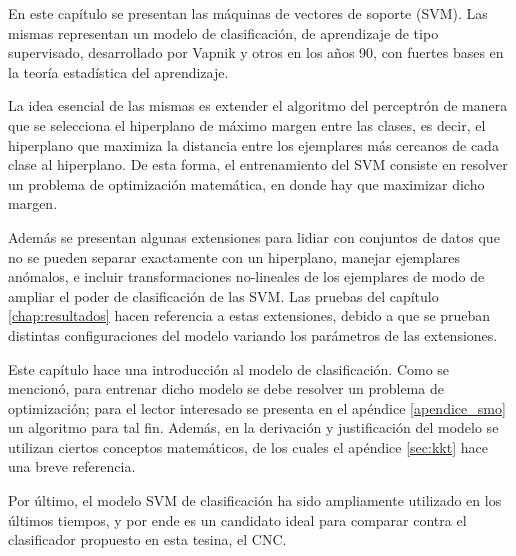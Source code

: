   
En este capítulo se presentan las máquinas de vectores de soporte (SVM). Las mismas representan un modelo de clasificación, de aprendizaje de tipo supervisado, desarrollado por Vapnik y otros en los años 90, con fuertes bases en la teoría estadística del aprendizaje. 

La idea esencial de las mismas es extender el algoritmo del perceptrón de manera que se selecciona el hiperplano de máximo margen entre las clases, es decir, el hiperplano que maximiza la distancia entre los ejemplares más cercanos de cada clase al hiperplano. De esta forma, el entrenamiento del SVM consiste en resolver un problema de optimización matemática, en donde hay que maximizar dicho margen.

Además se presentan algunas extensiones para lidiar con conjuntos de datos que no se pueden separar exactamente con un hiperplano, manejar ejemplares anómalos, e incluir transformaciones no-lineales de los ejemplares de modo de ampliar el poder de clasificación de las SVM. Las pruebas del capítulo \ref{chap:resultados} hacen referencia a estas extensiones, debido a que se prueban distintas configuraciones del modelo variando los parámetros de las extensiones.

Este capítulo hace una introducción al modelo de clasificación. Como se mencionó, para entrenar dicho modelo se debe resolver un problema de optimización; para el lector interesado se presenta en el apéndice \ref{apendice_smo} un algoritmo para tal fin. Además, en la derivación y justificación del modelo se utilizan ciertos conceptos matemáticos, de los cuales el apéndice \ref{sec:kkt} hace una breve referencia.

Por último, el modelo SVM de clasificación ha sido ampliamente utilizado en los últimos tiempos, y por ende es un candidato ideal para comparar contra el clasificador propuesto en esta tesina, el CNC.

